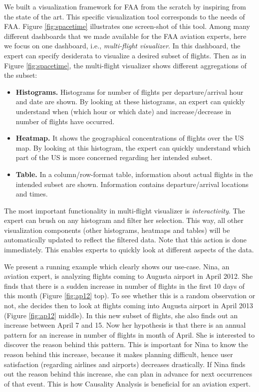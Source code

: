 \documentclass[conference]{IEEEtran}
\begin{document}
We built a visualization framework for FAA from the scratch by inspiring from the state of the art. This specific visualization tool corresponds to the needs of FAA. Figure \ref{fig:spacetime} illustrates one screen-shot of this tool. Among many different dashboards that we made available for the FAA aviation experts, here we focus on one dashboard, i.e., {\em multi-flight visualizer}. In this dashboard, the expert can specify desiderata to visualize a desired subset of flights. Then as in Figure \ref{fig:spacetime}, the multi-flight visualizer shows different aggregations of the subset:

\begin{itemize}
\item {\bf Histograms.} Histograms for number of flights per departure/arrival hour and date are shown. By looking at these histograms, an expert can quickly understand when (which hour or which date) and increase/decrease in number of flights have occurred.
\item {\bf Heatmap.} It shows the geographical concentrations of flights over the US map. By looking at this histogram, the expert can quickly understand which part of the US is more concerned regarding her intended subset.
\item {\bf Table.} In a column/row-format table, information about actual flights in the intended subset are shown. Information contains departure/arrival locations and times.
\end{itemize}

The most important functionality in multi-flight visualizer is {\em interactivity}. The expert can brush on any histogram and filter her selection. This way, all other visualization components (other histograms, heatmaps and tables) will be automatically updated to reflect the filtered data. Note that this action is done immediately. This enables experts to quickly look at different aspects of the data.

We present a running example which clearly shows our use-case. Nina, an aviation expert, is analyzing flights coming to Augusta airport in April 2012. She finds that there is a sudden increase in number of flights in the first 10 days of this month (Figure \ref{fig:ap12} top). To see whether this is a random observation or not, she decides then to look at flights coming into Augusta airport in April 2013 (Figure \ref{fig:ap12} middle). In this new subset of flights, she also finds out an increase between April 7 and 15. Now her hypothesis is that there is an annual pattern for an increase in number of flights in month of April. She is interested to discover the reason behind this pattern. This is important for Nina to know the reason behind this increase, because it makes planning difficult, hence user satisfaction (regarding airlines and airports) decreases drastically. If Nina finds out the reason behind this increase, she can plan in advance for next occurrences of that event. This is how Causality Analysis is beneficial for an aviation expert.
\end{document}
